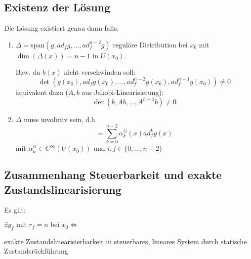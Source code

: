 \subsection{Existenz der Lösung}
Die Lösung existiert genau dann falls:
\begin{enumerate}
    \item 
        $\Delta = \text{span}(g, ad_f g, \ldots, ad_f^{n-2} g)$ reguläre Distribution
        bei $x_0$ mit $\dim(\Delta(x)) = n-1$ in $U(x_0)$.

        Bzw. da $b(x)$ nicht verschwinden soll:
        \begin{equation}
            \det(g(x_0), ad_f g(x_0), \ldots, ad_f^{n-2} g(x_0), ad_f^{n-1} g(x_0)) \neq 0
        \end{equation}
        äquivalent dazu ($A, b$ aus Jakobi-Linearisierung):
        \begin{equation}
            \det(b, Ab, \ldots, A^{n-1} b) \neq 0
        \end{equation}
    \item
        $\Delta$ muss involutiv sein, d.h 
        \begin{equation}
            [ad_f^i g(x), ad_f^j g(x)]
                = \sum_{k=0}^{n-2} \alpha_k^{ij} (x) ad_f^k g(x)
        \end{equation}
        mit $\alpha_k^{ij} \in C^\infty (U(x_0))$ und $i, j \in \{0, \ldots, n-2\}$
\end{enumerate}

\subsection{Zusammenhang Steuerbarkeit und exakte Zustandslinearisierung}
Es gilt: 

$\exists y_f \text{ mit } r_f = n \text{ bei } x_0 \Leftrightarrow$

exakte Zustandslinearisierbarkeit in steuerbares, lineares System durch statische 
Zustandsrückführung

